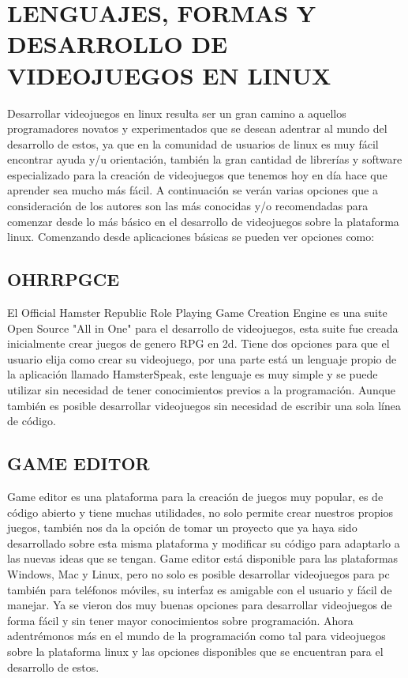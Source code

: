 \section*{LENGUAJES, FORMAS Y DESARROLLO DE VIDEOJUEGOS EN LINUX}

Desarrollar videojuegos en linux resulta ser un gran camino a
aquellos programadores novatos y experimentados que se
desean adentrar al mundo del desarrollo de estos, ya que en la
comunidad de usuarios de linux es muy fácil encontrar ayuda y/u
orientación, también la gran cantidad de librerías y software
especializado para la creación de videojuegos que tenemos hoy
en día hace que aprender sea mucho más fácil.
A continuación se verán varias opciones que a consideración de
los autores son las más conocidas y/o recomendadas para
comenzar desde lo más básico en el desarrollo de videojuegos
sobre la plataforma linux.
Comenzando desde aplicaciones básicas se pueden ver opciones
como:

\subsection*{OHRRPGCE}

El Official Hamster Republic Role Playing Game Creation Engine
es una suite Open Source "All in One" para el desarrollo de
videojuegos, esta suite fue creada inicialmente crear juegos de
genero RPG en 2d. Tiene dos opciones para que el usuario elija
como crear su videojuego, por una parte está un lenguaje propio
de la aplicación llamado HamsterSpeak, este lenguaje es muy
simple y se puede utilizar sin necesidad de tener conocimientos
previos a la programación. Aunque también es posible
desarrollar videojuegos sin necesidad de escribir una sola línea
de código.

\subsection*{GAME EDITOR}

Game editor es una plataforma para la creación de juegos muy
popular, es de código abierto y tiene muchas utilidades, no solo
permite crear nuestros propios juegos, también nos da la opción
de tomar un proyecto que ya haya sido desarrollado sobre esta
misma plataforma y modificar su código para adaptarlo a las
nuevas ideas que se tengan.
Game editor está disponible para las plataformas Windows, Mac
y Linux, pero no solo es posible desarrollar videojuegos para pc
también para teléfonos móviles, su interfaz es amigable con el
usuario y fácil de manejar.
Ya se vieron dos muy buenas opciones para desarrollar
videojuegos de forma fácil y sin tener mayor conocimientos
sobre programación. Ahora adentrémonos más en el mundo de
la programación como tal para videojuegos sobre la plataforma
linux y las opciones disponibles que se encuentran para el
desarrollo de estos.



